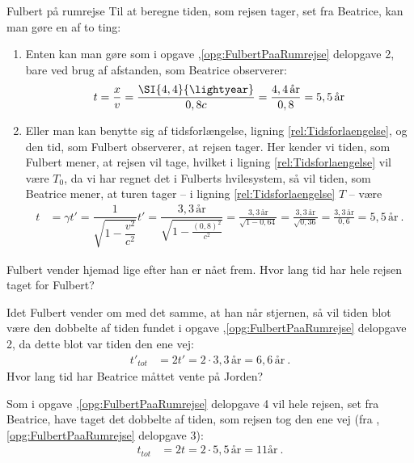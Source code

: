 \begin{opgave}{Fulbert på rumrejse}
    Til at beregne tiden, som rejsen tager, set fra Beatrice, kan man gøre en af to ting:
    \begin{enumerate}
        \item Enten kan man gøre som i opgave \thechapter,\ref{opg:FulbertPaaRumrejse} delopgave 2, bare ved brug af afstanden, som Beatrice observerer:
        \begin{align}
            t = \frac{x}{v} = \frac{\SI{4,4}{\lightyear}}{0,8c} = \frac{4,4 \, \text{år}}{0,8} = 5,5 \, \text{år}
        \end{align}
        \item Eller man kan benytte sig af tidsforlængelse, ligning \ref{rel:Tidsforlaengelse}, og den tid, som Fulbert observerer, at rejsen tager. Her kender vi tiden, som Fulbert mener, at rejsen vil tage, hvilket i ligning \ref{rel:Tidsforlaengelse} vil være $T_0$, da vi har regnet det i Fulberts hvilesystem, så vil tiden, som Beatrice mener, at turen tager -- i ligning \ref{rel:Tidsforlaengelse} $T$ -- være
        \begin{align}
            t &= \gamma t'
                = \dfrac{1}{\sqrt{1 - \dfrac{v^2}{c^2}}} t'
                = \dfrac{3,3 \, \text{år}}{\sqrt{1 - \frac{(0,8)^2}{c^2}}}
                = \frac{3,3 \, \text{år}}{\sqrt{1 - 0,64}}
                = \frac{3,3 \, \text{år}}{\sqrt{0,36}}
                = \frac{3,3 \, \text{år}}{0,6}
                = 5,5 \, \text{år} \: .
        \end{align}
    \end{enumerate}
    \opg Fulbert vender hjemad lige efter han er nået frem. Hvor lang tid har hele rejsen taget for Fulbert?
    
    Idet Fulbert vender om med det samme, at han når stjernen, så vil tiden blot være den dobbelte af tiden fundet i opgave \thechapter,\ref{opg:FulbertPaaRumrejse} delopgave 2, da dette blot var tiden den ene vej:
    \begin{align}
        t'_{tot} &= 2 t'
            = 2 \cdot 3,3 \, \text{år}
            = 6,6 \, \text{år} \: .
    \end{align}
    \opg Hvor lang tid har Beatrice måttet vente på Jorden?
    
    Som i opgave \thechapter,\ref{opg:FulbertPaaRumrejse} delopgave 4 vil hele rejsen, set fra Beatrice, have taget det dobbelte af tiden, som rejsen tog den ene vej (fra \thechapter,\ref{opg:FulbertPaaRumrejse} delopgave 3):
    \begin{align}
        t_{tot} &= 2 t
            = 2 \cdot 5,5 \, \text{år}
            = 11 \text{år} \: .
    \end{align}\\
    

\end{opgave}
